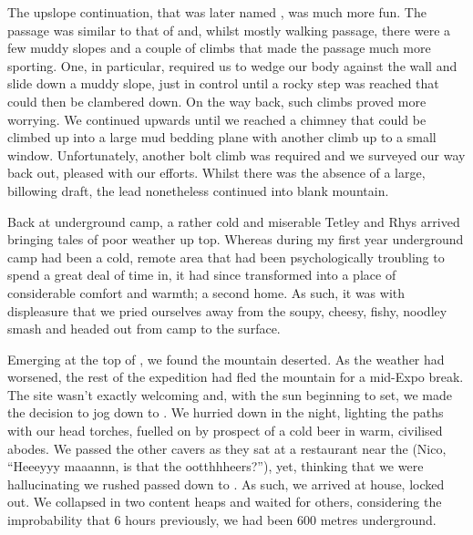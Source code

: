 The upslope continuation, that was later named , was
much more fun. The passage was similar to that of  and, whilst
mostly walking passage, there were a few muddy slopes and a couple of
climbs that made the passage much more sporting. One, in particular,
required us to wedge our body against the wall and slide down a muddy
slope, just in control until a rocky step was reached that could then be
clambered down. On the way back, such climbs proved more worrying. We
continued upwards until we reached a chimney that could be climbed up
into a large mud bedding plane with another climb up to a small window.
Unfortunately, another bolt climb was required and we surveyed our way
back out, pleased with our efforts. Whilst there was the absence of a
large, billowing draft, the lead nonetheless continued into blank
mountain.



Back at underground camp, a rather cold and miserable Tetley and Rhys
arrived bringing tales of poor weather up top. Whereas during my first
year underground camp had been a cold, remote area that had been
psychologically troubling to spend a great deal of time in, it had since
transformed into a place of considerable comfort and warmth; a second
home. As such, it was with displeasure that we pried ourselves away from
the soupy, cheesy, fishy, noodley smash and headed out from camp
 to the surface.





Emerging at the top of , we found the mountain deserted. As the
weather had worsened, the rest of the expedition had fled the mountain
for a mid-Expo break. The site wasn't exactly welcoming and, with the
sun beginning to set, we made the decision to jog down to . We
hurried down in the night, lighting the paths with our head torches,
fuelled on by prospect of a cold beer in warm, civilised abodes. We
passed the other cavers as they sat at a restaurant near the  (Nico, ``Heeeyyy maaannn, is that the ootthhheers?''), yet,
thinking that we were hallucinating we rushed passed down to . As
such, we arrived at  house, locked out. We collapsed in two
content heaps and waited for others, considering the improbability that
6 hours previously, we had been 600 metres underground.

